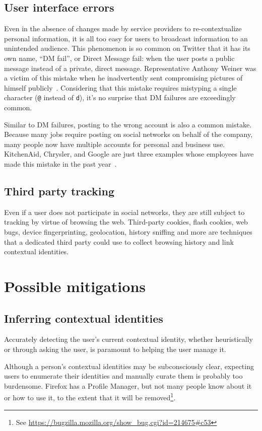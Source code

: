 \documentclass{llncs}
\begin{document}
\subsection{User interface errors}
Even in the absence of changes made by service providers to re-contextualize
personal information, it is all too easy for users to broadcast information to
an unintended audience. This phenomenon is so common on Twitter that it has its
own name, ``DM fail'', or Direct Message fail: when the user posts a public
message instead of a private, direct message. Representative Anthony Weiner was
a victim of this mistake when he inadvertently sent compromising pictures of
himself publicly~\cite{weiner}. Considering that this mistake requires
mistyping a single character (\texttt{@} instead of \texttt{d}), it's no
surprise that DM failures are exceedingly common.

Similar to DM failures, posting to the wrong account is also a common mistake.
Because many jobs require posting on social networks on behalf of the company,
many people now have multiple accounts for personal and business use.
KitchenAid, Chrysler, and Google are just three examples whose employees have
made this mistake in the past year~\cite{kitchenaid,chrysler,yegge}.

\subsection{Third party tracking}
\label{sec:tracking}
Even if a user does not participate in social networks, they are still subject
to tracking by virtue of browsing the web. Third-party cookies, flash cookies,
web bugs, device fingerprinting, geolocation, history sniffing and more are
techniques that a dedicated third party could use to collect browsing history
and link contextual identities.

\section{Possible mitigations}

\subsection{Inferring contextual identities}
Accurately detecting the user's current contextual identity, whether
heuristically or through asking the user, is paramount to helping the user
manage it.

Although a person's contextual identities may be subconsciously clear,
expecting users to enumerate their identities and manually curate them is
probably too burdensome. Firefox has a Profile Manager, but not many people
know about it or how to use it, to the extent that it will be
removed\footnote{See \url{https://bugzilla.mozilla.org/show\_bug.cgi?id=214675\#c53}}.
\end{document}
